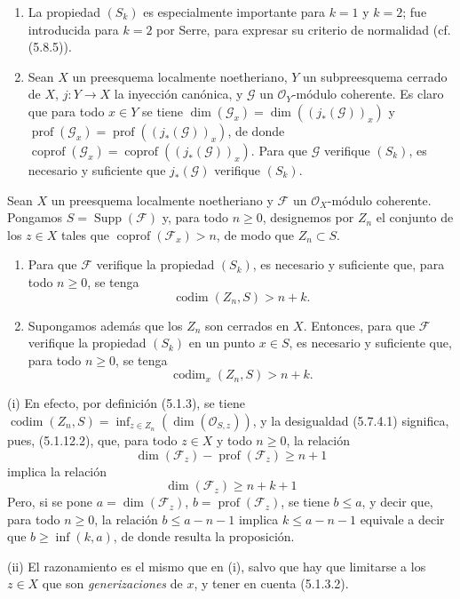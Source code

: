 \begin{remarks}[5.7.3]
\begin{enumerate}
\item[(v)] La propiedad $(S_k)$ es especialmente importante para $k=1$ y
$k=2$; fue introducida para $k=2$ por Serre, para expresar su criterio de
normalidad (cf. (5.8.5)).

\item[(vi)] Sean $X$ un preesquema localmente noetheriano, $Y$ un
subpreesquema cerrado de $X$, $j:Y\to X$ la inyección canónica, y
$\mathscr G$ un $\mathcal O_Y$-módulo coherente. Es claro que para todo
$x\in Y$ se tiene
$\dim(\mathscr G_x)=\dim((j_*(\mathscr G))_x)$ y
$\operatorname{prof}(\mathscr G_x)=\operatorname{prof}((j_*(\mathscr G))_x)$,
de donde
$\operatorname{coprof}(\mathscr G_x)=\operatorname{coprof}((j_*(\mathscr G))_x)$.
Para que $\mathscr G$ verifique $(S_k)$, es necesario y suficiente que
$j_*(\mathscr G)$ verifique $(S_k)$.
\end{enumerate}
\end{remarks}

\begin{proposition}[5.7.4]
\label{IV.2.s5.7.4-fr}
Sean $X$ un preesquema localmente noetheriano y $\mathscr F$ un
$\mathcal O_X$-módulo coherente. Pongamos
$S=\operatorname{Supp}(\mathscr F)$ y, para todo $n\geq0$, designemos por
$Z_n$ el conjunto de los $z\in X$ tales que
$\operatorname{coprof}(\mathscr F_x)>n$, de modo que $Z_n\subset S$.
\begin{enumerate}
\item[\textup{(i)}] Para que $\mathscr F$ verifique la propiedad $(S_k)$, es necesario
y suficiente que, para todo $n\geq0$, se tenga
\begin{equation}
\operatorname{codim}(Z_n,S)>n+k.
\tag{5.7.4.1}\label{IV.2.s5.7.4.1-fr}
\end{equation}
\item[\textup{(ii)}] Supongamos además que los $Z_n$ son cerrados en $X$. Entonces,
para que $\mathscr F$ verifique la propiedad $(S_k)$ en un punto $x\in S$, es
necesario y suficiente que, para todo $n\geq0$, se tenga
\begin{equation}
\operatorname{codim}_x(Z_n,S)>n+k.
\tag{5.7.4.2}\label{IV.2.s5.7.4.2-fr}
\end{equation}
\end{enumerate}
\end{proposition}

(i) En efecto, por definición (5.1.3), se tiene
$\operatorname{codim}(Z_n,S)=\inf_{z\in Z_n}(\dim(\mathcal O_{S,z}))$, y la
desigualdad (5.7.4.1) significa, pues, (5.1.12.2), que, para todo $z\in X$ y
todo $n\geq0$, la relación
\[
\dim(\mathscr F_z)-\operatorname{prof}(\mathscr F_z)\geq n+1
\]
implica la relación
\[
\dim(\mathscr F_z)\geq n+k+1
\]
Pero, si se pone $a=\dim(\mathscr F_z)$,
$b=\operatorname{prof}(\mathscr F_z)$, se tiene $b\leq a$, y decir que, para
todo $n\geq0$, la relación $b\leq a-n-1$ implica $k\leq a-n-1$ equivale a
decir que $b\geq\inf(k,a)$, de donde resulta la proposición.


(ii) El razonamiento es el mismo que en (i), salvo que hay que limitarse a
los $z\in X$ que son \emph{generizaciones} de $x$, y tener en cuenta (5.1.3.2).

